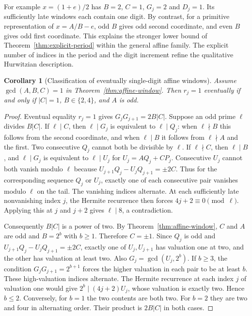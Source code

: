 \documentclass[11pt]{amsart}
\newtheorem{corollary}[theorem]{Corollary}
\theoremstyle{definition}
\theoremstyle{remark}
\numberwithin{equation}{section}
\begin{document}
For example $x=(1+e)/2$ has $B=2$, $C=1$, $G_j=2$ and $D_j=1$.
Its sufficiently late windows each contain one digit. By contrast,
for a primitive representation of $x=A/B-e$, odd $B$ gives odd
second coordinate, and even $B$ gives odd first coordinate. This
explains the stronger lower bound of Theorem~\ref{thm:explicit-period}
within the general affine family. The explicit number of indices in
the period and the digit increment refine the qualitative
Hurwitzian description.


\begin{corollary}[Classification of eventually single-digit affine windows]\label{cor:affine-single}
Assume $\gcd(A,B,C)=1$ in Theorem~\ref{thm:affine-window}.
Then $r_j=1$ eventually if and only if $|C|=1$, $B\in\{2,4\}$,
and $A$ is odd.
\end{corollary}
\begin{proof}
Eventual equality $r_j=1$ gives $G_jG_{j+1}=2B|C|$.
Suppose an odd prime $\ell$ divides $B|C|$. If $\ell\mid C$,
then $\ell\mid G_j$ is equivalent to $\ell\mid Q_j$:
when $\ell\nmid B$ this follows from the second coordinate, and
when $\ell\mid B$ it follows from $\ell\nmid A$ and the first.
Two consecutive $Q_j$ cannot both be divisible by $\ell$.
If $\ell\nmid C$, then $\ell\mid B$, and
$\ell\mid G_j$ is equivalent to $\ell\mid U_j$ for
$U_j=AQ_j+CP_j$. Consecutive $U_j$ cannot both vanish modulo $\ell$
because $U_{j+1}Q_j-U_jQ_{j+1}=\pm2C$.
Thus for the corresponding sequence $Q_j$ or $U_j$, exactly one
of each consecutive pair vanishes modulo $\ell$ on the tail.
The vanishing indices alternate. At each sufficiently late
nonvanishing index $j$, the Hermite recurrence then forces
$4j+2\equiv0\pmod\ell$. Applying this at $j$ and $j+2$ gives
$\ell\mid8$, a contradiction.

Consequently $B|C|$ is a power of two. By
Theorem~\ref{thm:affine-window}, $C$ and $A$ are odd and $B=2^b$
with $b\ge1$. Therefore $C=\pm1$. Since $Q_j$ is odd and
$U_{j+1}Q_j-U_jQ_{j+1}=\pm2C$, exactly one of $U_j,U_{j+1}$
has valuation one at two, and the other has valuation at least
two. Also $G_j=\gcd(U_j,2^b)$. If $b\ge3$, the condition
$G_jG_{j+1}=2^{b+1}$ forces the higher valuation in each pair to
be at least $b$. These high-valuation indices alternate.
The Hermite recurrence at each index $j$ of valuation one
would give $2^b\mid(4j+2)U_j$, whose valuation is exactly two.
Hence $b\le2$. Conversely, for $b=1$ the two contents are both
two. For $b=2$ they are two and four in alternating order.
Their product is $2B|C|$ in both cases.
\end{proof}
\end{document}
